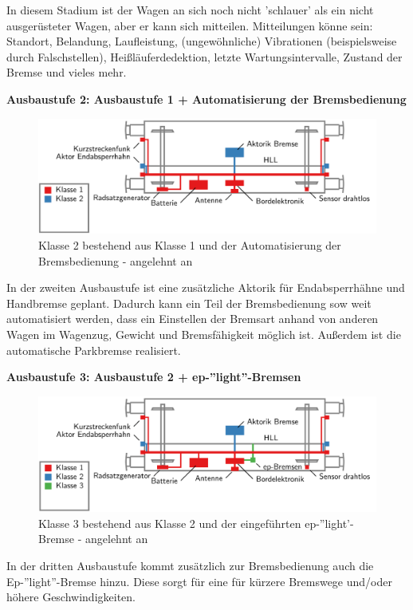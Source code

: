 In diesem Stadium ist der Wagen an sich noch nicht 'schlauer' als ein nicht ausgerüsteter Wagen, aber er kann sich mitteilen. Mitteilungen könne sein: Standort, Belandung, Laufleistung, (ungewöhnliche) Vibrationen (beispielsweise durch Falschstellen), Heißläuferdedektion, letzte Wartungsintervalle, Zustand der Bremse und vieles mehr.\par
\textbf{Ausbaustufe 2: Ausbaustufe 1 + Automatisierung der Bremsbedienung}\par
\begin{figure}[htbp] 
    \includegraphics[width=\textwidth]{Bilder/Ausbaustufen_2.PNG}
    \caption{Klasse 2 bestehend aus Klasse 1 und der Automatisierung der Bremsbedienung - angelehnt an \cite{ETR_3}}
    \label{fig:Klasse2}
\end{figure} 
In der zweiten Ausbaustufe ist eine zusätzliche Aktorik für Endabsperrhähne und Handbremse geplant. Dadurch kann ein Teil der Bremsbedienung sow weit automatisiert werden, dass ein Einstellen der Bremsart anhand von anderen Wagen im Wagenzug, Gewicht und Bremsfähigkeit möglich ist. Außerdem ist die automatische Parkbremse realisiert.\par
\textbf{Ausbaustufe 3: Ausbaustufe 2 + ep-''light''-Bremsen}\par
\begin{figure}[htbp] 
    \includegraphics[width=\textwidth]{Bilder/Ausbaustufen_3.PNG}
    \caption{Klasse 3 bestehend aus Klasse 2 und der eingeführten ep-''light'-Bremse - angelehnt an \cite{ETR_3}}
    \label{fig:Klasse3}
\end{figure} 
In der dritten Ausbaustufe kommt zusätzlich zur Bremsbedienung auch die Ep-''light''-Bremse hinzu. Diese sorgt für eine für kürzere Bremswege und/oder höhere Geschwindigkeiten.\par
